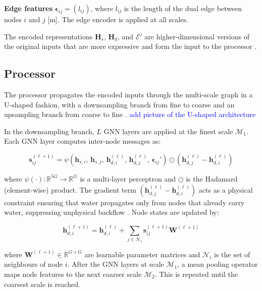\documentclass[12pt,a4paper]{report}
\begin{document}
\textbf{Edge features} $\boldsymbol{\epsilon}_{ij} = (l_{ij})$, where $l_{ij}$ is the length of
the dual edge between nodes $i$ and $j$ [m]. The edge encoder is applied at all scales.
 
The encoded representations $\mathbf{H}_s$, $\mathbf{H}_d$, and $\boldsymbol{\mathcal{E}}'$
are higher-dimensional versions of the original inputs that are more expressive and form
the input to the processor \citep{bentivoglio2025mswegnn}.
 
\subsection{Processor}
\label{subsec:processor}
 
The processor propagates the encoded inputs through the multi-scale graph in a U-shaped
fashion, with a downsampling branch from fine to coarse and an upsampling branch from
coarse to fine \citep{bentivoglio2025mswegnn,gao2019graphunets}.
\textcolor{blue}{add picture of the U-shaped architecture}
 
In the downsampling branch, $L$ GNN layers are applied at the finest scale
$\mathcal{M}_1$. Each GNN layer computes inter-node messages as:
 
\begin{equation}
    \mathbf{s}_{ij}^{(\ell+1)} = \psi\!\left(\mathbf{h}_{s,i},\, \mathbf{h}_{s,j},\,
    \mathbf{h}_{d,i}^{(\ell)},\, \mathbf{h}_{d,j}^{(\ell)},\,
    \boldsymbol{\epsilon}_{ij}'\right) \odot
    \left(\mathbf{h}_{d,j}^{(\ell)} - \mathbf{h}_{d,i}^{(\ell)}\right)
    \label{eq:message}
\end{equation}
 
where $\psi(\cdot): \mathbb{R}^{5G} \rightarrow \mathbb{R}^G$ is a multi-layer
perceptron and $\odot$ is the Hadamard (element-wise) product. The gradient term
$(\mathbf{h}_{d,j}^{(\ell)} - \mathbf{h}_{d,i}^{(\ell)})$ acts as a physical
constraint ensuring that water propagates only from nodes that already carry water,
suppressing unphysical backflow \citep{bentivoglio2025mswegnn}. Node states are updated by:
 
\begin{equation}
    \mathbf{h}_{d,i}^{(\ell+1)} = \mathbf{h}_{d,i}^{(\ell)} +
    \sum_{j \in \mathcal{N}_i} \mathbf{s}_{ij}^{(\ell+1)} \mathbf{W}^{(\ell+1)}
    \label{eq:node_update}
\end{equation}
 
where $\mathbf{W}^{(\ell+1)} \in \mathbb{R}^{G \times G}$ are learnable parameter
matrices and $\mathcal{N}_i$ is the set of neighbours of node $i$. After the GNN layers
at scale $\mathcal{M}_1$, a mean pooling operator maps node features to the next coarser
scale $\mathcal{M}_2$. This is repeated until the coarsest scale is reached.
 
\end{document}
